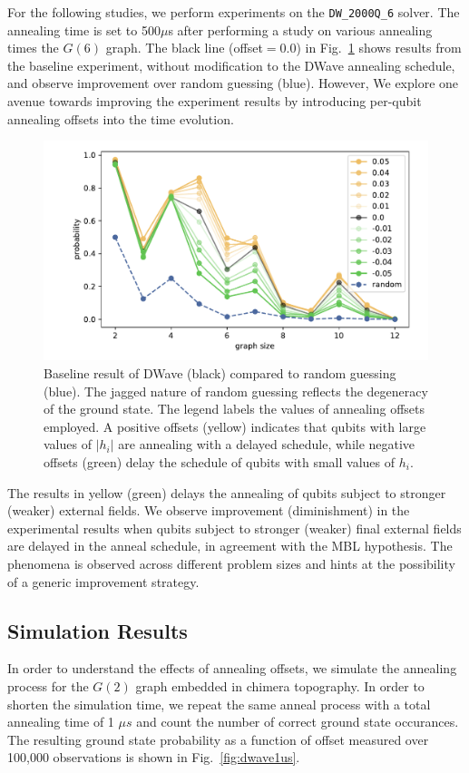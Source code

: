 \documentclass[prd,twocolumn,tightenlines,preprintnumbers,showpacs,superscriptaddress,notitlepage,nofootinbib,eqsecnum,floatfix,longbibliography,aps,10pt]{revtex4-2}
\begin{document}
For the following studies, we perform experiments on the \texttt{DW\_2000Q\_6} solver. The annealing time is set to 500$\mu$s after performing a study on various annealing times the $G(6)$ graph. The black line (offset$=0.0$) in Fig.~\ref{fig:baseline} shows results from the baseline experiment, without modification to the DWave annealing schedule, and observe improvement over random guessing (blue). However, We explore one avenue towards improving the experiment results by introducing per-qubit annealing offsets into the time evolution.

\begin{figure}
	\centering
	\includegraphics[width=\columnwidth]{./new_figures/DWave_scaling.pdf}
	\caption{Baseline result of DWave (black) compared to random guessing (blue). The jagged nature of random guessing reflects the degeneracy of the ground state. The legend labels the values of annealing offsets employed. A positive offsets (yellow) indicates that qubits with large values of $|h_i|$ are annealing with a delayed schedule, while negative offsets (green) delay the schedule of qubits with small values of $h_i$.}
	\label{fig:baseline}
\end{figure}


The results in yellow (green) delays the annealing of qubits subject to stronger (weaker) external fields. We observe improvement (diminishment) in the experimental results when qubits subject to stronger (weaker) final external fields are delayed in the anneal schedule, in agreement with the MBL hypothesis. The phenomena is observed across different problem sizes and hints at the possibility of a generic improvement strategy.


\subsection{Simulation Results}
\label{sec:results:simulation}
In order to understand the effects of annealing offsets, we simulate the annealing process for the $G(2)$ graph embedded in chimera topography.
In order to shorten the simulation time, we repeat the same anneal process with a total annealing time of 1 $\mu s$ and count the number of correct ground state occurances.
The resulting ground state probability as a function of offset measured over 100,000 observations is shown in Fig.~\ref{fig:dwave1us}.
\end{document}
